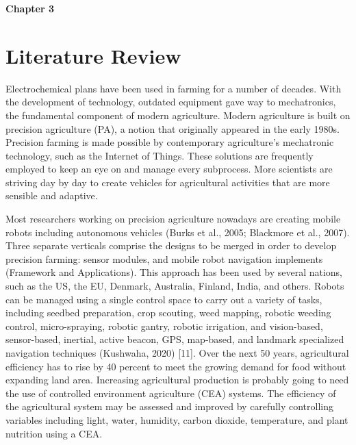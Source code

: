 \documentclass{book} %
\begin{document}
\noindent \textbf{}

\noindent 

\noindent \eject \textbf{}

\noindent \textbf{Chapter 3}

\noindent 
\chapter{Literature Review  }

\noindent Electrochemical plans have been used in farming for a number of decades. With the development of technology, outdated equipment gave way to mechatronics, the fundamental component of modern agriculture. Modern agriculture is built on precision agriculture (PA), a notion that originally appeared in the early 1980s. Precision farming is made possible by contemporary agriculture's mechatronic technology, such as the Internet of Things. These solutions are frequently employed to keep an eye on and manage every subprocess. More scientists are striving day by day to create vehicles for agricultural activities that are more sensible and adaptive. 

\noindent 

\noindent Most researchers working on precision agriculture nowadays are creating mobile robots including autonomous vehicles (Burks et al., 2005; Blackmore et al., 2007).  Three separate verticals comprise the designs to be merged in order to develop precision farming: sensor modules, and mobile robot navigation implements (Framework and Applications). This approach has been used by several nations, such as the US, the EU, Denmark, Australia, Finland, India, and others. Robots can be managed using a single control space to carry out a variety of tasks, including seedbed preparation, crop scouting, weed mapping, robotic weeding control, micro-spraying, robotic gantry, robotic irrigation, and vision-based, sensor-based, inertial, active beacon, GPS, map-based, and landmark specialized navigation techniques (Kushwaha, 2020)  [11]. Over the next 50 years, agricultural efficiency has to rise by 40 percent to meet the growing demand for food without expanding land area. Increasing agricultural production is probably going to need the use of controlled environment agriculture (CEA) systems. The efficiency of the agricultural system may be assessed and improved by carefully controlling variables including light, water, humidity, carbon dioxide, temperature, and plant nutrition using a CEA.

\noindent 
\end{document}
